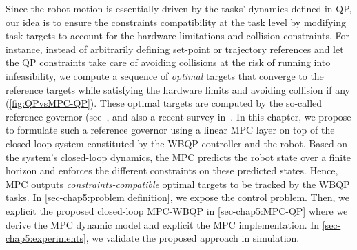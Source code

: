 Since the robot motion is essentially driven by the tasks' dynamics defined in QP, our idea is to ensure the constraints compatibility at the task level by modifying task targets to account for the hardware limitations and collision constraints. For instance,  instead of arbitrarily defining set-point or trajectory references and let the QP constraints take care of avoiding collisions at the risk of running into infeasibility, we compute a sequence of \emph{optimal} targets that converge to the reference targets while satisfying the hardware limits and avoiding collision if any (\cref{fig:QPvsMPC-QP}). These optimal targets are computed by the so-called reference governor (see~\cite{bemporad1998tac}, and also a recent survey in~\cite{garone2017automatica}.
In this chapter, we propose to formulate such a reference governor using a linear MPC layer on top of the closed-loop system constituted by the WBQP controller and the robot. Based on the system's closed-loop dynamics, the MPC  predicts the robot state over a finite horizon and enforces the different constraints on these predicted states. Hence, MPC outputs \emph{constraints-compatible} optimal targets to be tracked by the WBQP tasks. In \cref{sec-chap5:problem definition}, we expose the control problem. Then, we explicit the proposed closed-loop MPC-WBQP in \cref{sec-chap5:MPC-QP} where we derive the MPC dynamic model and explicit the MPC implementation. In \cref{sec-chap5:experiments}, we validate the proposed approach in simulation.

